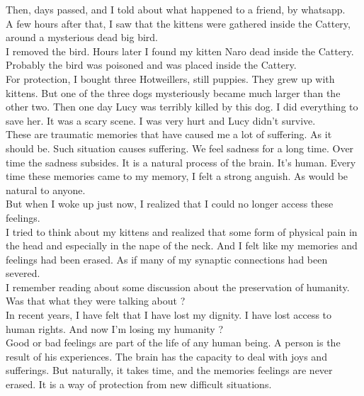 \documentclass[11pt]{book}
\begin{document}
\noindent Then, days passed, and I told about what happened to a friend, by whatsapp. \\

\noindent A few hours after that, I saw that the kittens were gathered inside the Cattery, around a mysterious dead big bird. \\

\noindent I removed the bird. Hours later I found my kitten Naro dead inside the Cattery. Probably the bird was poisoned and was placed inside the Cattery. \\

\noindent For protection, I bought three Hotweillers, still puppies. They grew up with kittens. But one of the three dogs mysteriously became much larger than the other two. Then one day Lucy was terribly killed by this dog. I did everything to save her. It was a scary scene. I was very hurt and Lucy didn't survive. \\

\noindent These are traumatic memories that have caused me a lot of suffering. As it should be. Such situation causes suffering. We feel sadness for a long time. Over time the sadness subsides. It is a natural process of the brain. It's human. Every time these memories came to my memory, I felt a strong anguish. As would be natural to anyone. \\

\noindent But when I woke up just now, I realized that I could no longer access these feelings. \\

\noindent I tried to think about my kittens and realized that some form of physical pain in the head and especially in the nape of the neck. And I felt like my memories and feelings had been erased. As if many of my synaptic connections had been severed. \\

\noindent I remember reading about some discussion about the preservation of humanity. Was that what they were talking about ? \\

\noindent In recent years, I have felt that I have lost my dignity. I have lost access to human rights. And now I'm losing my humanity ? \\

\noindent Good or bad feelings are part of the life of any human being. A person is the result of his experiences. The brain has the capacity to deal with joys and sufferings. But naturally, it takes time, and the memories feelings are never erased. It is a way of protection from new difficult situations. \\
\end{document}
